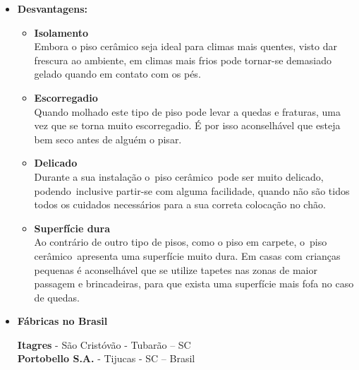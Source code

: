 \begin{itemize}
\item \textbf{Desvantagens:}

\begin{itemize}
\item \textbf{Isolamento}\\Embora o piso cerâmico seja ideal para climas mais quentes, visto dar frescura ao ambiente, em climas mais frios pode tornar-se demasiado gelado quando em contato com os pés.

\item \textbf{Escorregadio}\\Quando molhado este tipo de piso pode levar a quedas e fraturas, uma vez que se torna muito escorregadio. É por isso aconselhável que esteja bem seco antes de alguém o pisar.

\item \textbf{Delicado}\\Durante a sua instalação o piso cerâmico pode ser muito delicado, podendo inclusive partir-se com alguma facilidade, quando não são tidos todos os cuidados necessários para a sua correta colocação no chão.

\item \textbf{Superfície dura}\\Ao contrário de outro tipo de pisos, como o piso em carpete, o piso cerâmico apresenta uma superfície muito dura. Em casas com crianças pequenas é aconselhável que se utilize tapetes nas zonas de maior passagem e brincadeiras, para que exista uma superfície mais fofa no caso de quedas.
\end{itemize}


\item \textbf{Fábricas no Brasil}

\textbf{Itagres} - São Cristóvão - Tubarão – SC\\
\textbf{Portobello S.A.} - Tijucas - SC – Brasil

\end{itemize}

